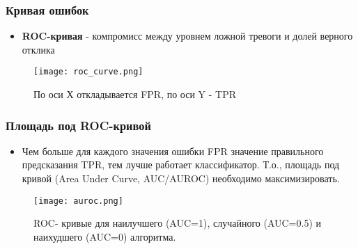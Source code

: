 \begin{frame}
    \frametitle{Кривая ошибок}
    \begin{itemize}
        \item \textbf{ROC-кривая} - компромисс между уровнем ложной тревоги и долей 
        верного отклика 
    \end{itemize}
    \begin{figure}
        \texttt{[image: roc\_curve.png]}
        \caption{По оси Х откладывается FPR, по оси Y - TPR}
    \end{figure}
\end{frame}
\begin{frame}
    \frametitle{Площадь под ROC-кривой}
    \begin{itemize}
        \item Чем больше для каждого значения ошибки FPR значение правильного 
        предсказания TPR, тем лучше работает классификатор. Т.о., площадь
        под кривой (Area Under Curve, AUC/AUROC) необходимо максимизировать.
    \end{itemize}
    \begin{figure}
        \texttt{[image: auroc.png]}
        \caption{ROC- кривые для наилучшего (AUC=1), случайного (AUC=0.5) 
        и наихудшего (AUC=0) алгоритма.}
    \end{figure}
\end{frame}
